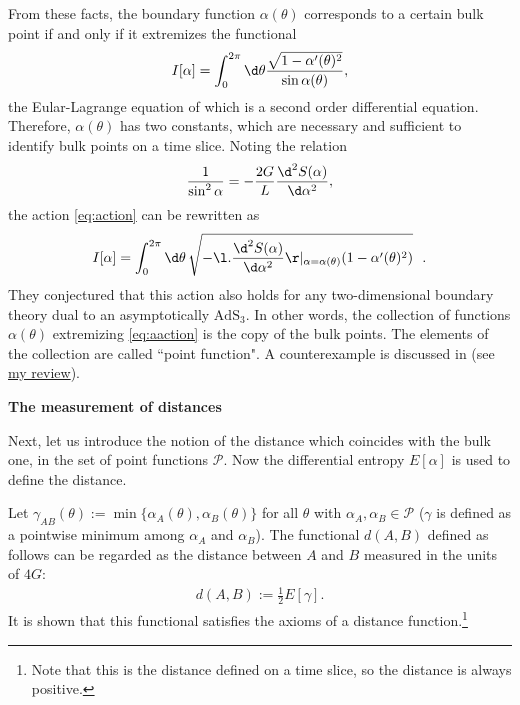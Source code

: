 \documentclass[12pt]{article}
\begin{document}
From these facts, the boundary function $\alpha(\theta)$ corresponds to a certain bulk point if and only if it extremizes the functional
\begin{align}
	I[\alpha] = \int_0^{2\pi}\d\theta \frac{\sqrt{1-\alpha'(\theta)^2}}{\sin\alpha(\theta)},\label{eq:action}
\end{align}
the Eular-Lagrange equation of which is a second order differential equation.
Therefore, $\alpha(\theta)$ has two constants, which are necessary and sufficient to identify bulk points on a time slice.
Noting the relation
\begin{align}
	\frac{1}{\sin^2\alpha} = -\frac{2G}{L}\frac{\d^2S(\alpha)}{\d\alpha^2},
\end{align}
the action \eqref{eq:action} can be rewritten as 
\begin{align}
	I[\alpha] = \int_0^{2\pi}\d\theta\,\sqrt{-\l.\frac{\d^2S(\alpha)}{\d\alpha^2}\r|_{\alpha = \alpha(\theta)}(1-\alpha'(\theta)^2)}~~.\label{eq:aaction}
\end{align}
They conjectured that this action also holds for any two-dimensional boundary theory dual to an asymptotically $\mathrm{AdS}_3$.
In other words, the collection of functions $\alpha(\theta)$ extremizing \eqref{eq:aaction} is the copy of the bulk points.
The elements of the collection are called ``point function".
A counterexample is discussed in \cite{Burda:2018rpb} (see \href{https://albertmcc.github.io/web/reviews/holographic_bubble.pdf}{\color{blue}my review}).


\noindent
\textbf{The measurement of distances}

Next, let us introduce the notion of the distance which coincides with the bulk one, in the set of point functions $\mathcal P$.
Now the differential entropy $E[\alpha]$ is used to define the distance.

Let $\gamma_{AB}(\theta) := \min\{\alpha_A(\theta),\alpha_B(\theta)\}$ for all $\theta$ with $\alpha_A,\alpha_B\in\mathcal P$ ($\gamma$ is defined as a pointwise minimum among $\alpha_A$ and $\alpha_B$).
The functional $d(A,B)$ defined as follows can be regarded as the distance between $A$ and $B$ measured in the units of $4G$:
\begin{align}
	d(A,B) := \frac{1}{2}E[\gamma].\label{eq:dist}
\end{align}
It is shown that this functional satisfies the axioms of a distance function.\footnote{
Note that this is the distance defined on a time slice, so the distance is always positive.}
\end{document}
